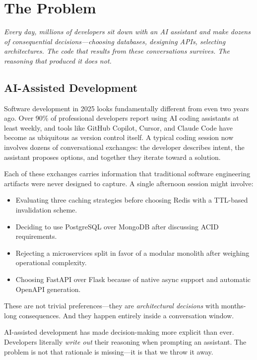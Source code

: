 \chapter{The Problem}
\label{ch:the-problem}

\textit{Every day, millions of developers sit down with an AI assistant and make
dozens of consequential decisions---choosing databases, designing APIs,
selecting architectures.  The code that results from these conversations
survives.  The reasoning that produced it does not.}

\section{AI-Assisted Development}
\label{sec:ai-dev}

Software development in 2025 looks fundamentally different from even two years
ago.  Over 90\% of professional developers report using AI coding assistants at
least weekly, and tools like GitHub Copilot, Cursor, and Claude Code have
become as ubiquitous as version control itself.  A typical coding session now
involves dozens of conversational exchanges: the developer describes intent,
the assistant proposes options, and together they iterate toward a solution.

Each of these exchanges carries information that traditional software
engineering artifacts were never designed to capture.  A single afternoon
session might involve:

\begin{itemize}
    \item Evaluating three caching strategies before choosing Redis with a
          TTL-based invalidation scheme.
    \item Deciding to use PostgreSQL over MongoDB after discussing ACID
          requirements.
    \item Rejecting a microservices split in favor of a modular monolith after
          weighing operational complexity.
    \item Choosing FastAPI over Flask because of native async support and
          automatic OpenAPI generation.
\end{itemize}

These are not trivial preferences---they are \emph{architectural decisions}
with months-long consequences.  And they happen entirely inside a conversation
window.

\begin{keyinsight}
AI-assisted development has made decision-making more explicit than ever.
Developers literally \emph{write out} their reasoning when prompting an
assistant.  The problem is not that rationale is missing---it is that we throw
it away.
\end{keyinsight}

